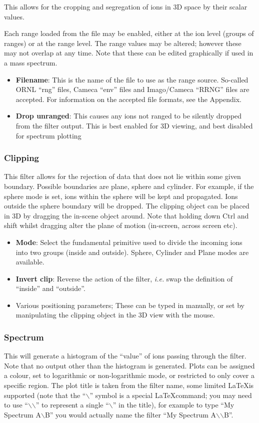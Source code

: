 \documentclass[10pt]{article}
\begin{document}
This allows for the cropping and segregation of ions in 3D space by their scalar values.

Each range loaded from the file may be enabled, either at the ion level (groups of ranges) or at the range level. The range values may be altered; however these may not overlap at any time. Note that these can be edited graphically if used in a mass spectrum.

\begin{itemize}
\item \textbf{Filename}: This is the name of the file to use as the range source. So-called ORNL ``rng'' files, Cameca ``env'' files and Imago/Cameca ``RRNG'' files are accepted. For information on the accepted file formats, see the Appendix.
\item \textbf{Drop unranged}: This causes any ions not ranged to be silently dropped from the filter output. This is best enabled for 3D viewing, and best disabled for spectrum plotting
\end{itemize}

 
\subsubsection{Clipping}
This filter allows for the rejection of data that does not lie within some given boundary. Possible boundaries are plane, sphere and cylinder. For example, if the sphere mode is set, ions within the sphere will be kept and propagated. Ions outside the sphere boundary will be dropped.  The clipping object can be placed in 3D by dragging the in-scene object around. Note that holding down Ctrl and shift whilst dragging alter the plane of motion (in-screen, across screen etc).

\begin{itemize}
\item  \textbf{Mode}: Select the fundamental primitive used to divide the incoming ions into two groups (inside and outside). Sphere, Cylinder and Plane modes are available.
\item \textbf{Invert clip}: Reverse the action of the filter, \emph{i.e.} swap the definition of ``inside'' and ``outside''.
\item  Various positioning parameters; These can be typed in manually, or set by manipulating the clipping object in the 3D view with the mouse.

\end{itemize}
\subsubsection{Spectrum}
 This will generate a histogram of the ``value'' of ions passing through the filter. Note that no output other than the histogram is generated. Plots can be assigned a colour, set to logarithmic or non-logarithmic mode, or restricted to only cover a specific region. The plot title is taken from the filter name, some limited \LaTeX is supported (note that the ``$\backslash$'' symbol is a special \LaTeX command; you may need to use ``$\backslash$$\backslash$'' to represent a single ``$\backslash$'' in the title), for example to type ``My Spectrum A$\backslash$B'' you would actually name the filter ``My Spectrum A$\backslash$$\backslash$B''.
 
\end{document}

